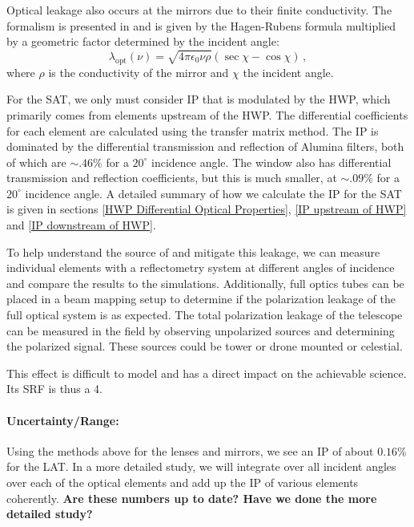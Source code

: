Optical leakage also occurs at the mirrors due to their finite conductivity. 
The formalism is presented in \cite{Barkats:2005sh} and is given by the Hagen-Rubens formula multiplied by 
a geometric factor determined by the incident angle:
\begin{equation}
\lambda_\text{opt}(\nu) = \sqrt{4 \pi \epsilon_0 \nu \rho} (\sec \chi - \cos \chi) \, ,
\end{equation}
where $\rho$ is the conductivity of the mirror and $\chi$ the incident angle.


For the SAT, we only must consider IP that is modulated by the HWP, which primarily comes from elements upstream of the HWP.
The differential coefficients for each element are calculated using the transfer matrix method.
The IP is dominated by the differential transmission and reflection of Alumina filters, both of which are $\sim.46\%$ for a $20^\circ$ incidence angle. 
The window also has differential transmission and reflection coefficients, but this is much smaller,
at $\sim.09\%$ for a $20^\circ$ incidence angle.
A detailed summary of how we calculate the IP for the SAT is given in sections \ref{HWP Differential Optical Properties},
\ref{IP upstream of HWP} and \ref{IP downstream of HWP}. 

To help understand the source of and mitigate this leakage, we can measure individual elements with a reflectometry system at different angles of incidence and compare the results to the simulations. Additionally, full optics tubes can be placed in a beam mapping setup to determine if the polarization leakage of the full optical system is as expected. The total polarization leakage of the telescope can be measured in the field by observing unpolarized sources and determining the polarized signal. These sources could be tower or drone mounted or celestial.

This effect is difficult to model and has a direct impact on the achievable science. Its SRF is thus a 4.

\paragraph{Uncertainty/Range:}
Using the methods above for the lenses and mirrors, we see an IP of about $0.16\%$ for the LAT.
In a more detailed study, we will integrate over all incident angles over each of the optical elements and add up the IP of various elements coherently. \textbf{Are these numbers up to date? Have we done the more detailed study?}

